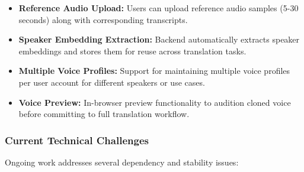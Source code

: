 \documentclass[12pt,oneside]{report}
\begin{document}
\begin{itemize}
    \item \textbf{Reference Audio Upload:} Users can upload reference audio samples (5-30 seconds) along with corresponding transcripts.
    
    \item \textbf{Speaker Embedding Extraction:} Backend automatically extracts speaker embeddings and stores them for reuse across translation tasks.
    
    \item \textbf{Multiple Voice Profiles:} Support for maintaining multiple voice profiles per user account for different speakers or use cases.
    
    \item \textbf{Voice Preview:} In-browser preview functionality to audition cloned voice before committing to full translation workflow.
\end{itemize}

\subsubsection{Current Technical Challenges}

Ongoing work addresses several dependency and stability issues:
\end{document}
